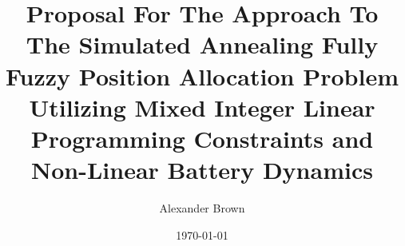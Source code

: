 \documentclass[11pt,a4paper,final]{article}
\author{Alexander Brown}
\date{\today}
\title{Proposal For The Approach To The Simulated Annealing Fully Fuzzy Position Allocation Problem Utilizing Mixed Integer Linear Programming Constraints and Non-Linear Battery Dynamics}
\begin{document}
\maketitle
\tableofcontents

\let\ref\autoref                            %




\end{document}

